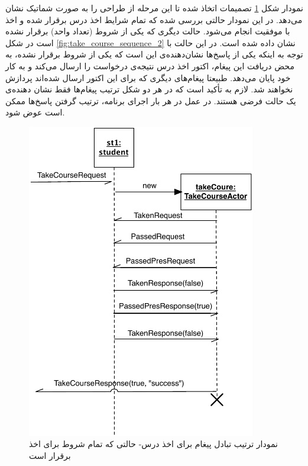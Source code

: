 نمودار شکل \ref{fig:take_course_sequence_1} تصمیمات اتخاذ شده تا این مرحله از طراحی را به صورت شماتیک نشان می‌دهد. در این نمودار حالتی بررسی شده که تمام شرایط اخذ درس برقرار شده و اخذ با موفقیت انجام می‌شود. حالت دیگری که یکی از شروط (تعداد واحد) برقرار نشده است در شکل \ref{fig:take_course_sequence_2} نشان داده شده است. در این حالت با توجه به اینکه یکی از پاسخ‌ها نشان‌دهنده‌ی این است که یکی از شروط برقرار نشده،‌ به محض دریافت این پیغام، اکتور اخذ درس نتیجه‌ی درخواست را ارسال می‌کند و به کار خود پایان می‌دهد. طبیعتا پیغام‌های دیگری که برای این اکتور ارسال شده‌اند پردازش نخواهند شد.
لازم به تأکید است که در هر دو شکل ترتیب پیغام‌ها فقط نشان دهنده‌ی یک حالت فرضی هستند. در عمل در هر بار اجرای برنامه، ترتیب گرفتن پاسخ‌ها ممکن است عوض شود.

\begin{figure}
    \begin{center}
	\includegraphics[width=10cm]{4-ProposedFramework/Figures/take_course_seq1.pdf}
    \end{center}
    \caption{\label{fig:take_course_sequence_1} نمودار ترتیب تبادل پیغام‌ برای اخذ درس- حالتی که تمام شروط برای اخذ برقرار است }
\end{figure}


